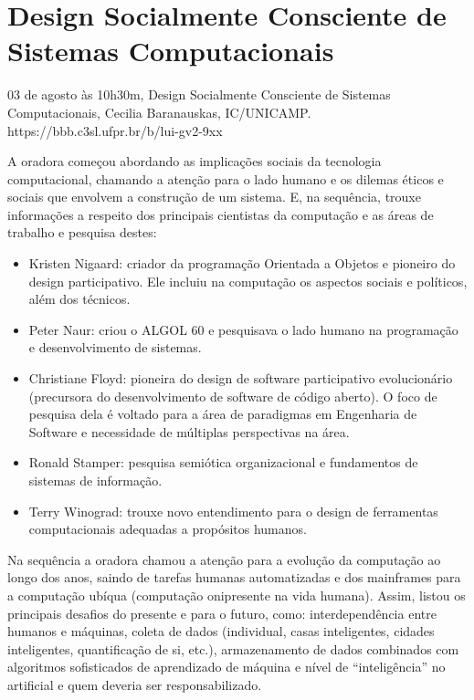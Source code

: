 \section{Design Socialmente Consciente de Sistemas Computacionais}

\begin{center}
  \vspace{1cm}
  03 de agosto às 10h30m, Design Socialmente Consciente de Sistemas Computacionais, Cecilia Baranauskas, IC/UNICAMP. https://bbb.c3sl.ufpr.br/b/lui-gv2-9xx
  \vspace{1cm}
\end{center}

A oradora começou abordando as implicações sociais da tecnologia computacional, chamando a atenção para o lado humano e os dilemas éticos e sociais que envolvem a construção de um sistema. E, na sequência, trouxe informações a respeito dos principais cientistas da computação e as áreas de trabalho e pesquisa destes:

\begin{itemize}
  \item Kristen Nigaard: criador da programação Orientada a Objetos e pioneiro do design participativo. Ele incluiu na computação os aspectos sociais e políticos, além dos técnicos.
  \item Peter Naur: criou o ALGOL 60 e pesquisava o lado humano na programação e desenvolvimento de sistemas.
  \item Christiane Floyd: pioneira do design de software participativo evolucionário (precursora do desenvolvimento de software de código aberto). O foco de pesquisa dela é voltado para a área de paradigmas em Engenharia de Software e necessidade de múltiplas perspectivas na área.
  \item Ronald Stamper: pesquisa semiótica organizacional e fundamentos de sistemas de informação.
  \item Terry Winograd: trouxe novo entendimento para o design de ferramentas computacionais adequadas a propósitos humanos.
\end{itemize}

Na sequência a oradora chamou a atenção para a evolução da computação ao longo dos anos, saindo de tarefas humanas automatizadas e dos mainframes para a computação ubíqua (computação onipresente na vida humana). Assim, listou os principais desafios do presente e para o futuro, como: interdependência entre humanos e máquinas, coleta de dados (individual, casas inteligentes, cidades inteligentes, quantificação de si, etc.), armazenamento de dados combinados com algoritmos sofisticados de aprendizado de máquina e nível de “inteligência” no artificial e quem deveria ser responsabilizado.

